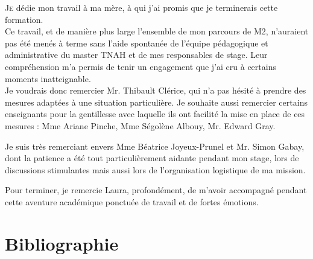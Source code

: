 \documentclass[a4paper,12pt,twoside]{book}
\begin{document}
\lettrine{J}e dédie mon travail à ma mère, à qui j'ai promis que je terminerais cette formation.\\

Ce travail, et de manière plus large l'ensemble de mon parcours de M2, n'auraient pas été menés à terme sans l'aide spontanée de l'équipe pédagogique et administrative du master TNAH et de mes responsables de stage. Leur compréhension m'a permis de tenir un engagement que j'ai cru à certains moments inatteignable. \\

Je voudrais donc remercier Mr. Thibault Clérice, qui n'a pas hésité à prendre des mesures adaptées à une situation particulière. Je souhaite aussi remercier certains enseignants pour la gentillesse avec laquelle ils ont facilité la mise en place de ces mesures : Mme Ariane Pinche, Mme Ségolène Albouy, Mr. Edward Gray.

Je suis très remerciant envers Mme Béatrice Joyeux-Prunel et Mr. Simon Gabay, dont la patience a été tout particulièrement aidante pendant mon stage, lors de discussions stimulantes mais aussi lors de l'organisation logistique de ma mission.

Pour terminer, je remercie Laura, profondément, de m'avoir accompagné pendant cette aventure académique ponctuée de travail et de fortes émotions. 


	
	\chapter*{Bibliographie}


\printbibliography[title={Catalogues traités (corpus Artl@s)}, heading=subbibliography, keyword={TNAHexpo}]

\printbibliography[title={Catalogues non traités (corpus Artl@s)}, heading=subbibliography, keyword={TNAHexpo_autres}]

\printbibliography[title={Histoire globale, histoire de l'art et histoire des catalogues}, heading=subbibliography, keyword={TNAHcatalogues}]

\printbibliography[title={Projet Artl@s}, heading=subbibliography, keyword={TNAHartlas}]

\printbibliography[title={Stages Artl@s}, heading=subbibliography, keyword={TNAHstages}]

\printbibliography[keyword={TNAH_hn_recherche}, heading=subbibliography, title={Humanités numériques : pédagogie, recherche et enjeux épistémologiques}]
\end{document}
